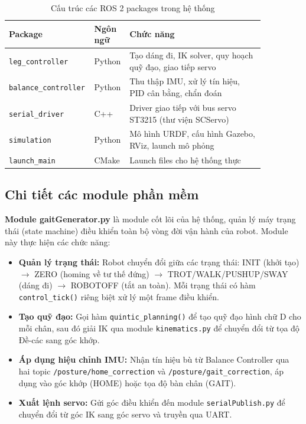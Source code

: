 \begin{table}[H]
\centering
\caption{Cấu trúc các ROS 2 packages trong hệ thống}
\label{tab:ros2_packages}
\renewcommand{\arraystretch}{1.3}
\begin{tabular}{|p{0.22\linewidth}|p{0.12\linewidth}|p{0.52\linewidth}|}
\hline
\textbf{Package} & \textbf{Ngôn ngữ} & \textbf{Chức năng} \\ \hline
\texttt{leg\_controller} & Python & Tạo dáng đi, IK solver, quy hoạch quỹ đạo, giao tiếp servo \\ \hline
\texttt{balance\_controller} & Python & Thu thập IMU, xử lý tín hiệu, PID cân bằng, chẩn đoán \\ \hline
\texttt{serial\_driver} & C++ & Driver giao tiếp với bus servo ST3215 (thư viện SCServo) \\ \hline
\texttt{simulation} & Python & Mô hình URDF, cấu hình Gazebo, RViz, launch mô phỏng \\ \hline
\texttt{launch\_main} & CMake & Launch files cho hệ thống thực \\ \hline
\end{tabular}
\end{table}

\subsection{Chi tiết các module phần mềm}

\textbf{Module gaitGenerator.py} là module cốt lõi của hệ thống, quản lý máy trạng thái (state machine) điều khiển toàn bộ vòng đời vận hành của robot. Module này thực hiện các chức năng:

\begin{itemize}
    \item \textbf{Quản lý trạng thái:} Robot chuyển đổi giữa các trạng thái: INIT (khởi tạo) $\rightarrow$ ZERO (homing về tư thế đứng) $\rightarrow$ TROT/WALK/PUSHUP/SWAY (dáng đi) $\rightarrow$ ROBOTOFF (tắt an toàn). Mỗi trạng thái có hàm \texttt{control\_tick()} riêng biệt xử lý một frame điều khiển.
    \item \textbf{Tạo quỹ đạo:} Gọi hàm \texttt{quintic\_planning()} để tạo quỹ đạo hình chữ D cho mỗi chân, sau đó giải IK qua module \texttt{kinematics.py} để chuyển đổi từ tọa độ Đề-các sang góc khớp.
    \item \textbf{Áp dụng hiệu chỉnh IMU:} Nhận tín hiệu bù từ Balance Controller qua hai topic \texttt{/posture/home\_correction} và \texttt{/posture/gait\_correction}, áp dụng vào góc khớp (HOME) hoặc tọa độ bàn chân (GAIT).
    \item \textbf{Xuất lệnh servo:} Gửi góc điều khiển đến module \texttt{serialPublish.py} để chuyển đổi từ góc IK sang góc servo và truyền qua UART.
\end{itemize}

